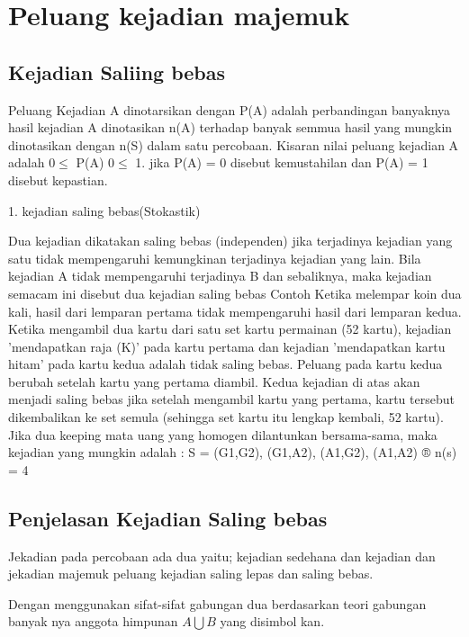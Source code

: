 \documentclass[11pt,fleqn]{book} %
\begin{document}
{\chapter{Peluang kejadian majemuk}
\section{Kejadian Saliing bebas}

Peluang Kejadian A dinotarsikan dengan P(A) adalah perbandingan banyaknya hasil kejadian A dinotasikan n(A) terhadap banyak semmua hasil yang mungkin dinotasikan dengan n(S) dalam satu percobaan. Kisaran nilai peluang kejadian A adalah $0 \leq$ P(A) $0 \leq$ 1. jika P(A) = 0 disebut kemustahilan dan P(A) = 1 disebut kepastian.

1. kejadian saling bebas(Stokastik)

Dua kejadian dikatakan saling bebas (independen) jika terjadinya kejadian yang satu tidak mempengaruhi kemungkinan terjadinya kejadian yang lain. Bila kejadian A tidak mempengaruhi terjadinya B dan sebaliknya, maka kejadian semacam ini disebut dua kejadian saling bebas
Contoh
Ketika melempar koin dua kali, hasil dari lemparan pertama tidak mempengaruhi hasil dari lemparan kedua.
Ketika mengambil dua kartu dari satu set kartu permainan (52 kartu), kejadian 'mendapatkan raja (K)' pada kartu pertama dan kejadian 'mendapatkan kartu hitam' pada kartu kedua adalah tidak saling bebas. Peluang pada kartu kedua berubah setelah kartu yang pertama diambil. Kedua kejadian di atas akan menjadi saling bebas jika setelah mengambil
kartu yang pertama, kartu tersebut dikembalikan ke set semula (sehingga set kartu itu lengkap kembali, 52 kartu).
Jika dua keeping mata uang yang homogen dilantunkan bersama-sama, maka kejadian yang mungkin adalah : S = {(G1,G2), (G1,A2), (A1,G2), (A1,A2)} ® n(s) = 4

\section{Penjelasan Kejadian Saling bebas}
\vspace{0.5cm} 
Jekadian pada percobaan ada dua yaitu;
kejadian sedehana dan kejadian dan jekadian majemuk
peluang kejadian saling lepas dan saling bebas.

Dengan menggunakan sifat-sifat gabungan dua berdasarkan teori gabungan banyak nya anggota himpunan $A\bigcup B$ yang disimbol kan.



}
\end{document}
